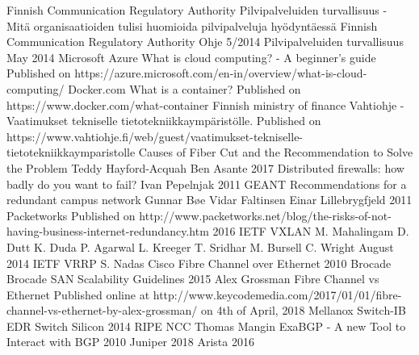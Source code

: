 \documentclass{article}
\begin{document}
\begin{thebibliography}{9}
	Finnish Communication Regulatory Authority
	Pilvipalveluiden turvallisuus - Mitä organisaatioiden tulisi huomioida pilvipalveluja hyödyntäessä
	Finnish Communication Regulatory Authority
	Ohje 5/2014 Pilvipalveluiden turvallisuus
	May 2014
        Microsoft Azure
        What is cloud computing? - A beginner's guide
        Published on https://azure.microsoft.com/en-in/overview/what-is-cloud-computing/
        Docker.com
        What is a container?
        Published on https://www.docker.com/what-container
	Finnish ministry of finance
	Vahtiohje - Vaatimukset tekniselle tietotekniikkaympäristölle.
	Published on https://www.vahtiohje.fi/web/guest/vaatimukset-tekniselle-tietotekniikkaymparistolle
	Causes of Fiber Cut and the Recommendation to Solve the Problem
	Teddy Hayford-Acquah
	Ben Asante
	2017
	Distributed firewalls: how badly do you want to fail?
	Ivan Pepelnjak
	2011
	GEANT
	Recommendations for a redundant campus network
	Gunnar Bøe
	Vidar Faltinsen
	Einar Lillebrygfjeld
	2011
	Packetworks
	Published on http://www.packetworks.net/blog/the-risks-of-not-having-business-internet-redundancy.htm
	2016
	IETF
	VXLAN
	M. Mahalingam
	D. Dutt
	K. Duda
	P. Agarwal
	L. Kreeger
	T. Sridhar
	M. Bursell
	C. Wright
	August 2014
	IETF
	VRRP
	S. Nadas
	Cisco
	Fibre Channel over Ethernet
	2010
	Brocade
	Brocade SAN Scalability Guidelines
	2015
	Alex Grossman
	Fibre Channel vs Ethernet
	Published online at http://www.keycodemedia.com/2017/01/01/fibre-channel-vs-ethernet-by-alex-grossman/
	on 4th of April, 2018
	Mellanox
	Switch-IB EDR Switch Silicon
	2014
	RIPE NCC
	Thomas Mangin
	ExaBGP - A new Tool to Interact with BGP
	2010
	Juniper
	2018
	Arista
	2016

\end{thebibliography}
\end{document}
